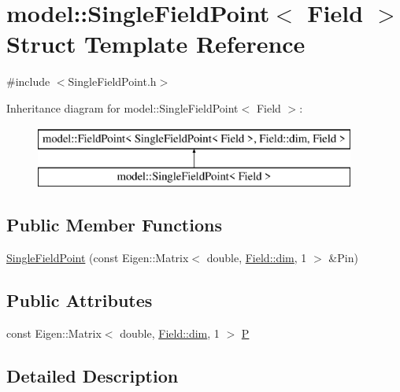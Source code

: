\hypertarget{structmodel_1_1_single_field_point}{}\section{model\+:\+:Single\+Field\+Point$<$ Field $>$ Struct Template Reference}
\label{structmodel_1_1_single_field_point}


{\ttfamily \#include $<$Single\+Field\+Point.\+h$>$}

Inheritance diagram for model\+:\+:Single\+Field\+Point$<$ Field $>$\+:\begin{figure}[H]
\begin{center}
\leavevmode
\includegraphics[height=2.000000cm]{structmodel_1_1_single_field_point}
\end{center}
\end{figure}
\subsection*{Public Member Functions}
\begin{DoxyCompactItemize}
\item 
\hyperlink{structmodel_1_1_single_field_point_a4993691bbf9870c226f46abd10614fe0}{Single\+Field\+Point} (const Eigen\+::\+Matrix$<$ double, \hyperlink{plot_nd_a_8m_a382f3ca768b275b8d563604f7fc7df73}{Field\+::dim}, 1 $>$ \&Pin)
\end{DoxyCompactItemize}
\subsection*{Public Attributes}
\begin{DoxyCompactItemize}
\item 
const Eigen\+::\+Matrix$<$ double, \hyperlink{plot_nd_a_8m_a382f3ca768b275b8d563604f7fc7df73}{Field\+::dim}, 1 $>$ \hyperlink{structmodel_1_1_single_field_point_a164f8dad62d322e31dba5578936c5963}{P}
\end{DoxyCompactItemize}


\subsection{Detailed Description}
